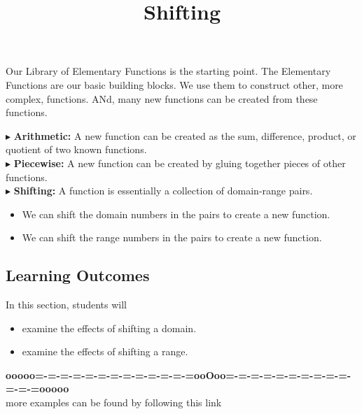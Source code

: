\documentclass{ximera}
\title{Shifting}
\begin{document}
\begin{abstract}
\end{abstract}
\maketitle



Our Library of Elementary Functions is the starting point.  The Elementary Functions are our basic building blocks.  We use them to construct other, more complex, functions.  ANd, many new functions can be created from these functions.


$\blacktriangleright$ \textbf{Arithmetic:} A new function can be created as the sum, difference, product, or quotient of two known functions. \\


$\blacktriangleright$ \textbf{Piecewise:} A new function can be created by gluing together pieces of other functions.  \\


$\blacktriangleright$ \textbf{Shifting:}  A function is essentially a collection of domain-range pairs.  


\begin{itemize}
\item We can shift the domain numbers in the pairs to create a new function.
\item We can shift the range numbers in the pairs to create a new function.
\end{itemize}




\subsection{Learning Outcomes}


\begin{sectionOutcomes}
In this section, students will 

\begin{itemize}
\item examine the effects of shifting a domain.
\item examine the effects of shifting a range.
\end{itemize}
\end{sectionOutcomes}











\begin{center}
\textbf{\textcolor{green!50!black}{ooooo=-=-=-=-=-=-=-=-=-=-=-=-=ooOoo=-=-=-=-=-=-=-=-=-=-=-=-=ooooo}} \\

more examples can be found by following this link\\ 

\end{center}
\end{document}
